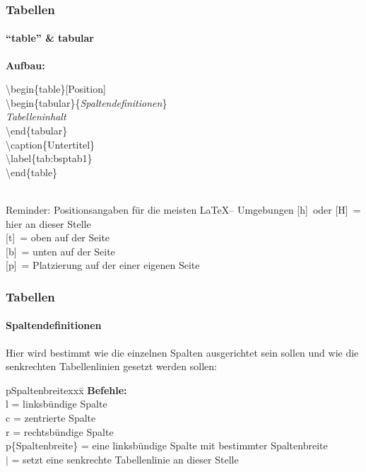 \begin{frame}
\frametitle{Tabellen}
\framesubtitle{``table'' \& \glqq tabular\grqq}
\textbf{Aufbau:}\\[2mm]
\color{unibablueI}\begin{ttfamily}\textbackslash begin\color{black}\{table\}\color{nounibagreenI}[Position]\color{black}\\
\color{unibablueI}\textbackslash begin\color{black}\{tabular\}\{\textit{Spaltendefinitionen}\}\\
\textit{Tabelleninhalt}\\
\color{unibablueI}\textbackslash end\color{black}\{tabular\}\\
\color{nounibaredI}\textbackslash caption\color{black}\{Untertitel\}\\
\color{nounibaredI}\textbackslash label\color{black}\{tab:bsptab1\}\\
\color{unibablueI}\textbackslash end\color{black}\{table\}\\
~\\
\end{ttfamily}

\begin{block}{Reminder: Positionsangaben f\"ur die meisten \LaTeX -- Umgebungen}
\color{nounibagreenI}[h]\color{black}~oder \color{nounibagreenI}[H]\color{black}~= hier an dieser Stelle\\
\color{nounibagreenI}[t]\color{black}~= oben auf der Seite\\ 
\color{nounibagreenI}[b]\color{black}~= unten auf der Seite\\ 
\color{nounibagreenI}[p]\color{black}~= Platzierung auf der einer eigenen Seite
\end{block}
\end{frame}


\begin{frame}
\frametitle{Tabellen}
\framesubtitle{Spaltendefinitionen}
Hier wird bestimmt wie die einzelnen Spalten ausgerichtet sein sollen
und wie die senkrechten Tabellenlinien gesetzt werden sollen:\\[3mm]
\begin{tabbing}[H]p{Spaltenbreite}xxx\=\kill
\textbf{Befehle:}\\
l \>= linksbündige Spalte\\
c \>= zentrierte Spalte\\
r \>= rechtsbündige Spalte\\
p\{Spaltenbreite\} \>= eine linksbündige Spalte mit bestimmter Spaltenbreite\\
\color{nounibaredI}$|$\color{black} \>= setzt eine senkrechte Tabellenlinie an
dieser Stelle\\
\end{tabbing}
\end{frame}

